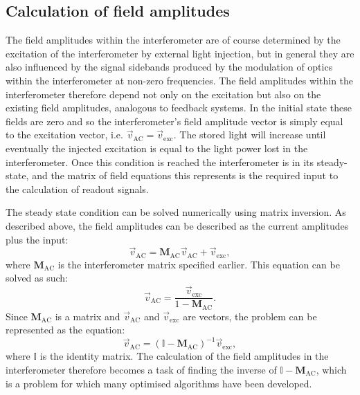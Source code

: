 \subsection{Calculation of field amplitudes}
The field amplitudes within the interferometer are of course determined by the excitation of the interferometer by external light injection, but in general they are also influenced by the signal sidebands produced by the modulation of optics within the interferometer at non-zero frequencies. The field amplitudes within the interferometer therefore depend not only on the excitation but also on the existing field amplitudes, analogous to feedback systems. In the initial state these fields are zero and so the interferometer's field amplitude vector is simply equal to the excitation vector, i.e. $\vec{v}_{\text{AC}} = \vec{v}_{\text{exc}}$. The stored light will increase until eventually the injected excitation is equal to the light power lost in the interferometer. Once this condition is reached the interferometer is in its steady-state, and the matrix of field equations this represents is the required input to the calculation of readout signals.

The steady state condition can be solved numerically using matrix inversion. As described above, the field amplitudes can be described as the current amplitudes plus the input:
\begin{equation}
  \vec{v}_{\text{AC}} = \mathbf{M}_{\text{AC}} \vec{v}_{\text{AC}} + \vec{v}_{\text{exc}},
\end{equation}
where $\mathbf{M}_{\text{AC}}$ is the interferometer matrix specified earlier. This equation can be solved as such:
\begin{equation}
  \vec{v}_{\text{AC}} = \frac{\vec{v}_{\text{exc}}}{1 - \mathbf{M}_{\text{AC}}}.
\end{equation}
Since $\mathbf{M}_{\text{AC}}$ is a matrix and $\vec{v}_{\text{AC}}$ and $\vec{v}_{\text{exc}}$ are vectors, the problem can be represented as the equation:
\begin{equation}
  \vec{v}_{\text{AC}} = \left( \mathbb{I} - \mathbf{M}_{\text{AC}} \right)^{-1} \vec{v}_{\text{exc}},
\end{equation}
where $\mathbb{I}$ is the identity matrix. The calculation of the field amplitudes in the interferometer therefore becomes a task of finding the inverse of $\mathbb{I} - \mathbf{M}_{\text{AC}}$, which is a problem for which many optimised algorithms have been developed.

